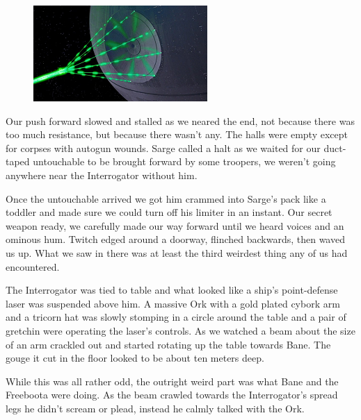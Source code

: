 \begin{figure}
	\begin{center}
		\includegraphics[width=\figwidth]{pics/9/53.png}
	\end{center}
\end{figure}
Our push forward slowed and stalled as we neared the end, not because there was too much resistance, but because there wasn't any. 
The halls were empty except for corpses with autogun wounds. 
Sarge called a halt as we waited for our duct-taped untouchable to be brought forward by some troopers, we weren't going anywhere near the Interrogator without him.

Once the untouchable arrived we got him crammed into Sarge's pack like a toddler and made sure we could turn off his limiter in an instant. 
Our secret weapon ready, we carefully made our way forward until we heard voices and an ominous hum. 
Twitch edged around a doorway, flinched backwards, then waved us up. 
What we saw in there was at least the third weirdest thing any of us had encountered.

The Interrogator was tied to table and what looked like a ship's point-defense laser was suspended above him. 
A massive Ork with a gold plated cybork arm and a tricorn hat was slowly stomping in a circle around the table and a pair of gretchin were operating the laser's controls. 
As we watched a beam about the size of an arm crackled out and started rotating up the table towards Bane. 
The gouge it cut in the floor looked to be about ten meters deep.

While this was all rather odd, the outright weird part was what Bane and the Freeboota were doing. 
As the beam crawled towards the Interrogator's spread legs he didn't scream or plead, instead he calmly talked with the Ork.

